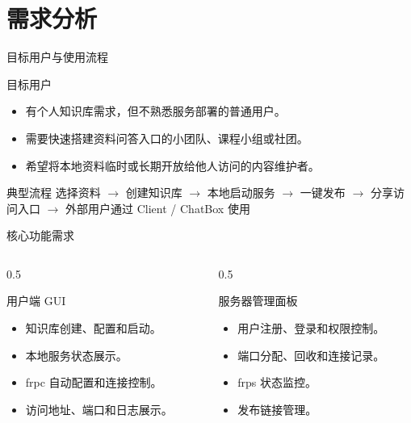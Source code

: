 \documentclass[aspectratio=169]{beamer}
\begin{document}
\section{需求分析}

\begin{frame}{目标用户与使用流程}
    \begin{block}{目标用户}
        \begin{itemize}
            \item 有个人知识库需求，但不熟悉服务部署的普通用户。
            \item 需要快速搭建资料问答入口的小团队、课程小组或社团。
            \item 希望将本地资料临时或长期开放给他人访问的内容维护者。
        \end{itemize}
    \end{block}

    \begin{block}{典型流程}
        选择资料 $\rightarrow$ 创建知识库 $\rightarrow$ 本地启动服务 $\rightarrow$ 一键发布 $\rightarrow$ 分享访问入口 $\rightarrow$ 外部用户通过 Client / ChatBox 使用
    \end{block}
\end{frame}

\begin{frame}{核心功能需求}
    \begin{columns}[T]
        \begin{column}{0.5\textwidth}
            \begin{block}{用户端 GUI}
                \begin{itemize}
                    \item 知识库创建、配置和启动。
                    \item 本地服务状态展示。
                    \item frpc 自动配置和连接控制。
                    \item 访问地址、端口和日志展示。
                \end{itemize}
            \end{block}
        \end{column}
        \begin{column}{0.5\textwidth}
            \begin{block}{服务器管理面板}
                \begin{itemize}
                    \item 用户注册、登录和权限控制。
                    \item 端口分配、回收和连接记录。
                    \item frps 状态监控。
                    \item 发布链接管理。
                \end{itemize}
            \end{block}
        \end{column}
    \end{columns}
\end{frame}
\end{document}
